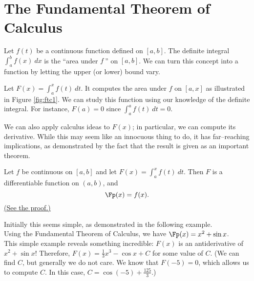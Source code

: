 \section{The Fundamental Theorem of Calculus}\label{sec:FTC}

Let $f(t)$ be a continuous function defined on $[a,b]$. The definite integral $\int_a^b f(x)\ dx$ is the ``area under $f\ $'' on $[a,b]$. We can turn this concept into a function by letting the upper (or lower) bound vary.

Let $F(x) = \int_a^x f(t)\ dt$. It computes the area under $f$ on $[a,x]$ as illustrated in Figure \ref{fig:ftc1}. We can study this function using our knowledge of the definite integral. For instance, $F(a)=0$ since $\int_a^af(t)\ dt=0$. %


We can also apply calculus ideas to $F(x)$; in particular, we can compute its derivative. While this may seem like an innocuous thing to do, it has far--reaching implications, as demonstrated by the fact that the result is given as an important theorem.

{Let $f$ be continuous on $[a,b]$ and let $F(x) = \int_a^x f(t)\ dt$. Then $F$ is a differentiable function on $(a,b)$, and $$\Fp(x)=f(x).$$
\hfill\hyperref[pf:FTC1]{(See the proof.)}
}


Initially this seems simple, as demonstrated in the following example.\\

{Using the Fundamental Theorem of Calculus, we have $\Fp(x) = x^2+\sin x$.
}\\

This simple example reveals something incredible: $F(x)$ is an antiderivative of $x^2+\sin x$! Therefore, $F(x) = \frac13x^3-\cos x+C$ for some value of $C$. (We can find $C$, but generally we do not care. We know that $F(-5)=0$, which allows us to compute $C$. In this case, $C=\cos(-5)+\frac{125}3$.)

